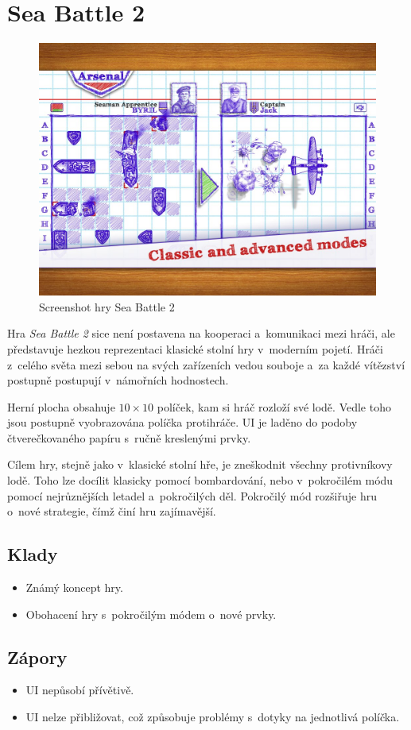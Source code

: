 \section{Sea Battle 2}

\begin{figure}
    \centering
    \includegraphics[width=0.5\linewidth]{assets/competitive-apps/sea-battle.jpg}
    \caption{Screenshot hry Sea Battle 2~\cite{byril_sea_battle_2}}
    \label{fig:sea-battle}
\end{figure}

Hra \emph{Sea Battle 2} sice není postavena na kooperaci a~komunikaci mezi
hráči,
ale představuje hezkou reprezentaci klasické stolní hry v~moderním pojetí.
Hráči z~celého světa mezi sebou na svých zařízeních vedou souboje
a~za každé vítězství postupně postupují v~námořních
hodnostech.~\cite{byril_sea_battle_2}

Herní plocha obsahuje $10 \times 10$ políček,
kam si hráč rozloží své lodě.
Vedle toho jsou postupně vyobrazována políčka protihráče.
UI je laděno do podoby čtverečkovaného papíru s~ručně kreslenými prvky.

Cílem hry, stejně jako v~klasické stolní hře,
je zneškodnit všechny protivníkovy lodě.
Toho lze docílit klasicky pomocí bombardování,
nebo v~pokročilém módu pomocí nejrůznějších letadel a~pokročilých děl.
Pokročilý mód rozšiřuje hru o~nové strategie,
čímž činí hru zajímavější.

\subsection*{Klady}

\begin{itemize}
    \item Známý koncept hry.
    \item Obohacení hry s~pokročilým módem o~nové prvky.
\end{itemize}

\subsection*{Zápory}

\begin{itemize}
    \item UI nepůsobí přívětivě.
    \item UI nelze přibližovat,
    což způsobuje problémy s~dotyky na jednotlivá políčka.
\end{itemize}
